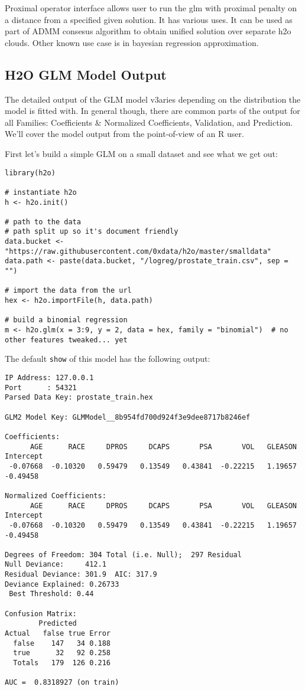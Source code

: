 \documentclass[11pt]{article}
\begin{document}
Proximal operator interface allows user to run the glm with proximal penalty on a distance from a specified given solution. It has various uses. It can be used as part of ADMM consesus algorithm to obtain unified solution over separate h2o clouds. Other known use case is in bayesian regression approximation.

\subsection{H2O GLM Model Output}
The detailed output of the GLM model v3aries depending on the distribution the model is fitted with. In general though, there are common parts of the output for all Families: Coefficients \& Normalized Coefficients, Validation, and Prediction. We'll cover the model output from the point-of-view of an R user.

First let's build a simple GLM on a small dataset and see what we get out:

\begin{verbatim}
library(h2o)

# instantiate h2o
h <- h2o.init()

# path to the data
# path split up so it's document friendly
data.bucket <- "https://raw.githubusercontent.com/0xdata/h2o/master/smalldata"
data.path <- paste(data.bucket, "/logreg/prostate_train.csv", sep = "")

# import the data from the url
hex <- h2o.importFile(h, data.path)

# build a binomial regression
m <- h2o.glm(x = 3:9, y = 2, data = hex, family = "binomial")  # no other features tweaked... yet
\end{verbatim}

The default \texttt{show} of this model has the following output:

\begin{verbatim}
IP Address: 127.0.0.1 
Port      : 54321 
Parsed Data Key: prostate_train.hex 

GLM2 Model Key: GLMModel__8b954fd700d924f3e9dee8717b8246ef

Coefficients:
      AGE      RACE     DPROS     DCAPS       PSA       VOL   GLEASON Intercept 
 -0.07668  -0.10320   0.59479   0.13549   0.43841  -0.22215   1.19657  -0.49458 

Normalized Coefficients:
      AGE      RACE     DPROS     DCAPS       PSA       VOL   GLEASON Intercept 
 -0.07668  -0.10320   0.59479   0.13549   0.43841  -0.22215   1.19657  -0.49458 

Degrees of Freedom: 304 Total (i.e. Null);  297 Residual
Null Deviance:     412.1
Residual Deviance: 301.9  AIC: 317.9
Deviance Explained: 0.26733 
 Best Threshold: 0.44

Confusion Matrix:
        Predicted
Actual   false true Error
  false    147   34 0.188
  true      32   92 0.258
  Totals   179  126 0.216

AUC =  0.8318927 (on train) 
\end{verbatim}
\end{document}
